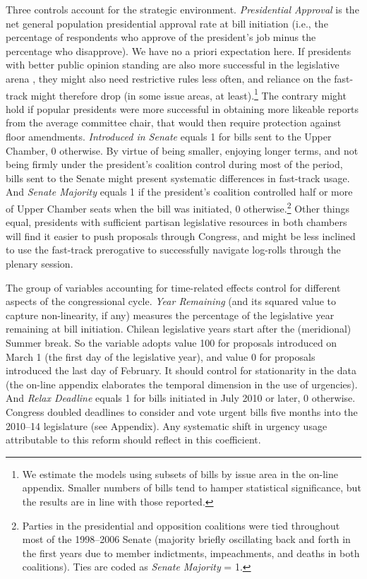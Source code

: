 \documentclass[letter,12pt]{article}
\begin{document}
Three controls account for the strategic environment. \emph{Presidential Approval} is the net general population presidential approval rate at bill initiation (i.e., the percentage of respondents who approve of the president's job minus the percentage who disapprove). We have no a priori expectation here. If presidents with better public opinion standing are also more successful in the legislative arena \citep{bond.fleisher.1990,aleman.navia.UrgChi.2009}, they might also need restrictive rules less often, and reliance on the fast-track might therefore drop (in some issue areas, at least).\footnote{We estimate the models using subsets of bills by issue area in the on-line appendix. Smaller numbers of bills tend to hamper statistical significance, but the results are in line with those reported.} The contrary might hold if popular presidents were more successful in obtaining more likeable reports from the average committee chair, that would then require protection against floor amendments. \emph{Introduced in Senate} equals 1 for bills sent to the Upper Chamber, 0 otherwise. By virtue of being smaller, enjoying longer terms, and not being firmly under the president's coalition control during most of the period, bills sent to the Senate might present systematic differences in fast-track usage. And \emph{Senate Majority} equals 1 if the president's coalition controlled half or more of Upper Chamber seats when the bill was initiated, 0 otherwise.\footnote{Parties in the presidential and opposition coalitions were tied throughout most of the 1998--2006 Senate (majority briefly oscillating back and forth in the first years due to member indictments, impeachments, and deaths in both coalitions). Ties are coded as \emph{Senate Majority} = 1.} Other things equal, presidents with sufficient partisan legislative resources in both chambers will find it easier to push proposals through Congress, and might be less inclined to use the fast-track prerogative to successfully navigate log-rolls through the plenary session.

The group of variables accounting for time-related effects control for different aspects of the congressional cycle. \emph{Year Remaining} (and its squared value to capture non-linearity, if any) measures the percentage of the legislative year remaining at bill initiation. Chilean legislative years start after the (meridional) Summer break. So the variable adopts value 100 for proposals introduced on March 1 (the first day of the legislative year), and value 0 for proposals introduced the last day of February. It should control for stationarity in the data (the on-line appendix elaborates the temporal dimension in the use of urgencies). And \emph{Relax Deadline} equals 1 for bills initiated in July 2010 or later, 0 otherwise. Congress doubled deadlines to consider and vote urgent bills five months into the 2010--14 legislature (see Appendix). Any systematic shift in urgency usage attributable to this reform should reflect in this coefficient. 
\end{document}
